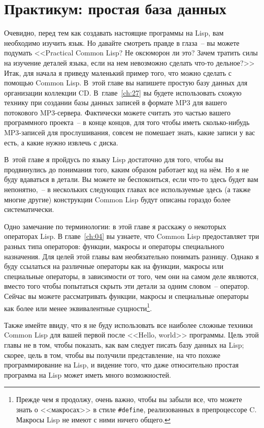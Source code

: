 \chapter{Практикум: простая база данных}
\label{ch:03}

\thispagestyle{empty}

Очевидно, перед тем как создавать настоящие программы на Lisp, вам необходимо изучить
язык. Но давайте смотреть правде в глаза~-- вы можете подумать <<Practical Common Lisp?
Не оксюморон ли это? Зачем тратить силы на изучение деталей языка, если на нем невозможно
сделать что-то дельное?>> Итак, для начала я приведу маленький пример того, что можно
сделать с помощью Common Lisp. В~этой главе вы напишете простую базу данных для
организации коллекции CD. В~главе~\ref{ch:27} вы будете использовать схожую технику при создании
базы данных записей в формате MP3 для вашего потокового MP3-сервера. Фактически можете
считать это частью вашего программного проекта~-- в конце концов, для того чтобы иметь
сколько-нибудь MP3-записей для прослушивания, совсем не помешает знать, какие записи у вас
есть, а какие нужно извлечь с диска.

В~этой главе я пройдусь по языку Lisp достаточно для того, чтобы вы продвинулись до
понимания того, каким образом работает код на нём. Но я не буду вдаваться в детали. Вы
можете не беспокоиться, если что-то здесь будет вам непонятно,~-- в нескольких следующих
главах все используемые здесь (а также многие другие) конструкции Common Lisp будут
описаны гораздо более систематически.

Одно замечание по терминологии: в этой главе я расскажу о некоторых операторах Lisp. В
главе~\ref{ch:04} вы узнаете, что Common Lisp предоставляет три разных типа операторов: функции,
макросы и операторы специального назначения. Для целей этой главы вам необязательно
понимать разницу. Однако я буду ссылаться на различные операторы как на функции, макросы
или специальные операторы, в зависимости от того, чем они на самом деле являются, вместо
того чтобы попытаться скрыть эти детали за одним словом~-- оператор. Сейчас вы можете
рассматривать функции, макросы и специальные операторы как более или менее эквивалентные
сущности\footnote{Прежде чем я продолжу, очень важно, чтобы вы забыли все, что можете
  знать о <<макросах>> в стиле \lstinline!#define!, реализованных в препроцессоре C. Макросы
  Lisp не имеют с ними ничего общего.}.

Также имейте ввиду, что я не буду использовать все наиболее сложные техники Common Lisp
для вашей первой после <<Hello, world>> программы. Цель этой главы не в том, чтобы показать,
как вам следует писать базу данных на Lisp; скорее, цель в том, чтобы вы получили
представление, на что похоже программирование на Lisp, и видение того, что даже
относительно простая программа на Lisp может иметь много возможностей.

